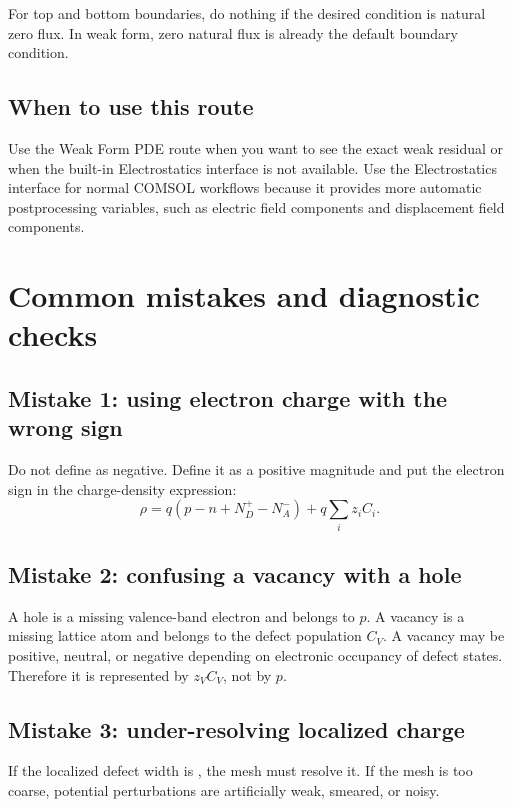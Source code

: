 \documentclass[11pt]{article}
\newcommand{\code}[1]{\texttt{\detokenize{#1}}}
\begin{document}
For top and bottom boundaries, do nothing if the desired condition is natural zero flux. In weak form, zero natural flux is already the default boundary condition.

\subsection{When to use this route}

Use the Weak Form PDE route when you want to see the exact weak residual or when the built-in Electrostatics interface is not available. Use the Electrostatics interface for normal COMSOL workflows because it provides more automatic postprocessing variables, such as electric field components and displacement field components.

\section{Common mistakes and diagnostic checks}

\subsection{Mistake 1: using electron charge with the wrong sign}

Do not define \code{q0} as negative. Define it as a positive magnitude and put the electron sign in the charge-density expression:
\begin{equation}
\rho=q(p-n+N_D^+-N_A^-)+q\sum_i z_iC_i.
\end{equation}

\subsection{Mistake 2: confusing a vacancy with a hole}

A hole is a missing valence-band electron and belongs to $p$. A vacancy is a missing lattice atom and belongs to the defect population $C_V$. A vacancy may be positive, neutral, or negative depending on electronic occupancy of defect states. Therefore it is represented by $z_VC_V$, not by $p$.

\subsection{Mistake 3: under-resolving localized charge}

If the localized defect width is \code{sigdef}, the mesh must resolve it. If the mesh is too coarse, potential perturbations are artificially weak, smeared, or noisy.
\end{document}

